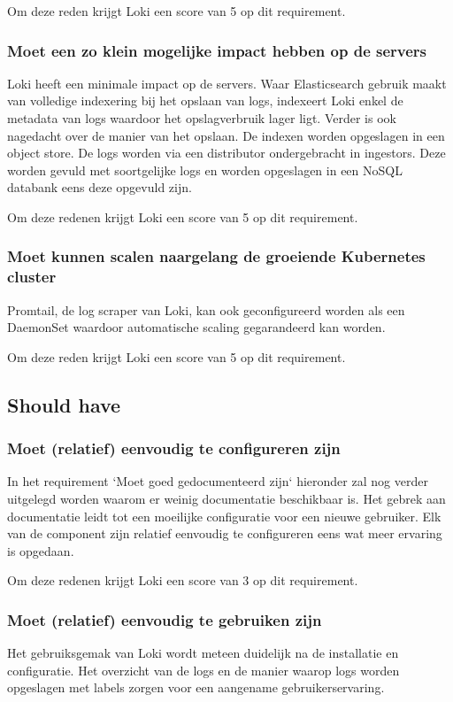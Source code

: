 Om deze reden krijgt Loki een score van 5 op dit requirement.

\subsubsection{Moet een zo klein mogelijke impact hebben op de servers}
Loki heeft een minimale impact op de servers. Waar Elasticsearch gebruik maakt van volledige indexering bij het opslaan van logs, indexeert Loki enkel de metadata van logs waardoor het opslagverbruik lager ligt. Verder is ook nagedacht over de manier van het opslaan. De indexen worden opgeslagen in een object store. De logs worden via een distributor ondergebracht in ingestors. Deze worden gevuld met soortgelijke logs en worden opgeslagen in een NoSQL databank eens deze opgevuld zijn.

Om deze redenen krijgt Loki een score van 5 op dit requirement.

\subsubsection{Moet kunnen scalen naargelang de groeiende Kubernetes cluster}
Promtail, de log scraper van Loki, kan ook geconfigureerd worden als een DaemonSet waardoor automatische scaling gegarandeerd kan worden. 

Om deze reden krijgt Loki een score van 5 op dit requirement.

\subsection{Should have}
\subsubsection{Moet (relatief) eenvoudig te configureren zijn}
In het requirement `Moet goed gedocumenteerd zijn` hieronder zal nog verder uitgelegd worden waarom er weinig documentatie beschikbaar is. Het gebrek aan documentatie leidt tot een moeilijke configuratie voor een nieuwe gebruiker. Elk van de component zijn relatief eenvoudig te configureren eens wat meer ervaring is opgedaan.

Om deze redenen krijgt Loki een score van 3 op dit requirement.

\subsubsection{Moet (relatief) eenvoudig te gebruiken zijn}
Het gebruiksgemak van Loki wordt meteen duidelijk na de installatie en configuratie. Het overzicht van de logs en de manier waarop logs worden opgeslagen met labels  zorgen voor een aangename gebruikerservaring.

